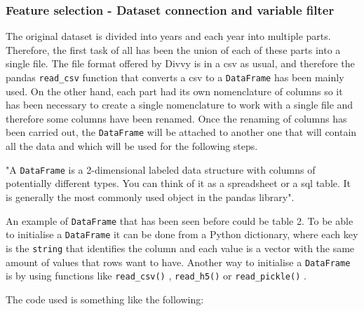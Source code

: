 \subsubsection{Feature selection - Dataset connection and variable filter}\label{feature-selection}

The original dataset \cite{divvy} is divided into years and each year into multiple parts. Therefore, the first task of all has been the union of each of these parts into a single file. The file format offered by Divvy is in a \acrshort{csv} as usual, and therefore the pandas \small{\verb|read_csv|} \normalsize  function that converts a \acrshort{csv} to a \small{\verb|DataFrame|} \normalsize  has been mainly used. On the other hand, each part had its own nomenclature of columns so it has been necessary to create a single nomenclature to work with a single file and therefore some columns have been renamed. Once the renaming of columns has been carried out, the \small{\verb|DataFrame|} \normalsize will be attached to another one that will contain all the data and which will be used for the following steps.


\begin{displayquote}
"A \small{\verb|DataFrame|} \normalsize  is a 2-dimensional labeled data structure with columns of potentially different types. You can think of it as a spreadsheet or a \acrshort{sql} table. It is generally the most commonly used object in the pandas library". \cite{pandas}
\end{displayquote}


An example of \small{\verb|DataFrame|} \normalsize  that has been seen before could be table 2. To be able to initialise a \small{\verb|DataFrame|} \normalsize  it can be done from a Python dictionary, where each key is the \small{\verb|string|} \normalsize  that identifies the column and each value is a vector with the same amount of values that rows want to have. Another way to initialise a \small{\verb|DataFrame|} \normalsize  is by using functions like \small{\verb|read_csv()|} \normalsize , \small{\verb|read_h5()|} \normalsize  or \small{\verb|read_pickle()|} \normalsize .
\newline

The code used is something like the following: 

